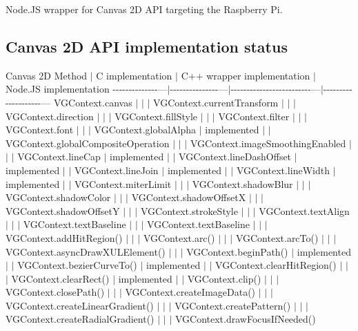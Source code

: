 Node.\+J\+S wrapper for Canvas 2\+D A\+P\+I targeting the Raspberry Pi.

\subsection*{Canvas 2\+D A\+P\+I implementation status}

Canvas 2\+D Method $\vert$ C implementation $\vert$ C++ wrapper implementation $\vert$ Node.\+J\+S implementation -\/-\/-\/-\/-\/-\/-\/-\/-\/-\/-\/-\/-\/-\/---$\vert$-\/-\/-\/-\/-\/-\/-\/-\/-\/-\/-\/-\/-\/-\/-\/---$\vert$-\/-\/-\/-\/-\/-\/-\/-\/-\/-\/-\/-\/-\/-\/-\/-\/-\/-\/-\/-\/-\/-\/-\/-\/-\/---$\vert$-\/-\/-\/-\/-\/-\/-\/-\/-\/-\/-\/-\/-\/-\/-\/-\/-\/-\/-\/-\/--- {\ttfamily V\+G\+Context.\+canvas} $\vert$ $\vert$ $\vert$ {\ttfamily V\+G\+Context.\+current\+Transform} $\vert$ $\vert$ $\vert$ {\ttfamily V\+G\+Context.\+direction} $\vert$ $\vert$ $\vert$ {\ttfamily V\+G\+Context.\+fill\+Style} $\vert$ $\vert$ $\vert$ {\ttfamily V\+G\+Context.\+filter} $\vert$ $\vert$ $\vert$ {\ttfamily V\+G\+Context.\+font} $\vert$ $\vert$ $\vert$ {\ttfamily V\+G\+Context.\+global\+Alpha} $\vert$ implemented $\vert$ $\vert$ {\ttfamily V\+G\+Context.\+global\+Composite\+Operation} $\vert$ $\vert$ $\vert$ {\ttfamily V\+G\+Context.\+image\+Smoothing\+Enabled} $\vert$ $\vert$ $\vert$ {\ttfamily V\+G\+Context.\+line\+Cap} $\vert$ implemented $\vert$ $\vert$ {\ttfamily V\+G\+Context.\+line\+Dash\+Offset} $\vert$ implemented $\vert$ $\vert$ {\ttfamily V\+G\+Context.\+line\+Join} $\vert$ implemented $\vert$ $\vert$ {\ttfamily V\+G\+Context.\+line\+Width} $\vert$ implemented $\vert$ $\vert$ {\ttfamily V\+G\+Context.\+miter\+Limit} $\vert$ $\vert$ $\vert$ {\ttfamily V\+G\+Context.\+shadow\+Blur} $\vert$ $\vert$ $\vert$ {\ttfamily V\+G\+Context.\+shadow\+Color} $\vert$ $\vert$ $\vert$ {\ttfamily V\+G\+Context.\+shadow\+Offset\+X} $\vert$ $\vert$ $\vert$ {\ttfamily V\+G\+Context.\+shadow\+Offset\+Y} $\vert$ $\vert$ $\vert$ {\ttfamily V\+G\+Context.\+stroke\+Style} $\vert$ $\vert$ $\vert$ {\ttfamily V\+G\+Context.\+text\+Align} $\vert$ $\vert$ $\vert$ {\ttfamily V\+G\+Context.\+text\+Baseline} $\vert$ $\vert$ $\vert$ {\ttfamily V\+G\+Context.\+text\+Baseline} $\vert$ $\vert$ $\vert$ {\ttfamily V\+G\+Context.\+add\+Hit\+Region()} $\vert$ $\vert$ $\vert$ {\ttfamily V\+G\+Context.\+arc()} $\vert$ $\vert$ $\vert$ {\ttfamily V\+G\+Context.\+arc\+To()} $\vert$ $\vert$ $\vert$ {\ttfamily V\+G\+Context.\+async\+Draw\+X\+U\+L\+Element()} $\vert$ $\vert$ $\vert$ {\ttfamily V\+G\+Context.\+begin\+Path()} $\vert$ implemented $\vert$ $\vert$ {\ttfamily V\+G\+Context.\+bezier\+Curve\+To()} $\vert$ implemented $\vert$ $\vert$ {\ttfamily V\+G\+Context.\+clear\+Hit\+Region()} $\vert$ $\vert$ $\vert$ {\ttfamily V\+G\+Context.\+clear\+Rect()} $\vert$ implemented $\vert$ $\vert$ {\ttfamily V\+G\+Context.\+clip()} $\vert$ $\vert$ $\vert$ {\ttfamily V\+G\+Context.\+close\+Path()} $\vert$ $\vert$ $\vert$ {\ttfamily V\+G\+Context.\+create\+Image\+Data()} $\vert$ $\vert$ $\vert$ {\ttfamily V\+G\+Context.\+create\+Linear\+Gradient()} $\vert$ $\vert$ $\vert$ {\ttfamily V\+G\+Context.\+create\+Pattern()} $\vert$ $\vert$ $\vert$ {\ttfamily V\+G\+Context.\+create\+Radial\+Gradient()} $\vert$ $\vert$ $\vert$ {\ttfamily V\+G\+Context.\+draw\+Focus\+If\+Needed()} 